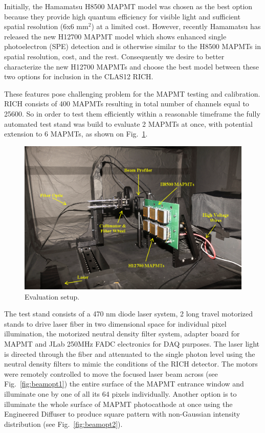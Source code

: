 \documentclass[5p,times,preprint]{elsarticle}
\begin{document}
Initially, the Hamamatsu H8500 MAPMT model \cite{H8500} was chosen as the best option because they provide high quantum efficiency for visible light and sufficient spatial resolution (6x6 mm$^2$) at a limited cost.  However, recently Hamamatsu has released the new H12700 MAPMT model which shows enhanced single photoelectron (SPE) detection and is otherwise similar to the H8500 MAPMTs in spatial resolution, cost, and the rest.  Consequently we desire to better characterize the new H12700 MAPMTs \cite{H12700} and choose the best model between these two options for inclusion in the CLAS12 RICH.

These features pose challenging problem for the MAPMT testing and calibration.
RICH consists of 400 MAPMTs resulting in total number of channels equal to 25600. So in order to test them efficiently within a reasonable timeframe the fully automated test stand was build to evaluate 2 MAPMTs at once, with potential extension to 6 MAPMTs, as shown on Fig.~\ref{fig:MAPMTtest}.

\begin{figure}[hbt]
	\centering
	\includegraphics[width=0.9\linewidth]{blackbox.png}
	\caption{Evaluation setup.}
	\label{fig:MAPMTtest}
\end{figure}

The test stand consists of a 470 nm diode laser system, 2 long travel motorized stands to drive laser fiber in two dimensional space for individual pixel illumination, the motorized neutral density filter system, adapter board for MAPMT and JLab 250MHz FADC electronics for DAQ purposes.
The laser light is directed through the fiber and attenuated to the single photon level using the neutral density filters to mimic the conditions of the RICH detector.
The motors were remotely controlled to move the focused laser beam across (see Fig.~\ref{fig:beamopt1}) the entire surface of the MAPMT entrance window and illuminate one by one of all its 64 pixels individually.
Another option is to illuminate the whole surface of MAPMT photocathode at once using the Engineered Diffuser to produce square pattern with non-Gaussian intensity distribution (see Fig.~\ref{fig:beamopt2}).
\end{document}
